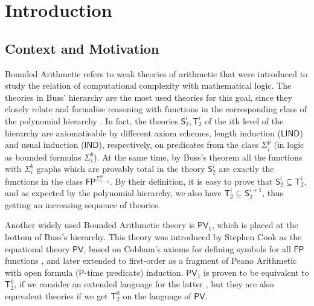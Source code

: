 \documentclass[11pt]{article}
\renewcommand{\P}{\mathsf{P}}
\newcommand{\PV}{\mathsf{PV}}
\newcommand{\FP}{\mathsf{FP}}
\theoremstyle{definition}
\theoremstyle{definition}
\theoremstyle{remark}
\begin{document}
\newpage
\tableofcontents

\newpage

\section{Introduction}

\subsection{Context and Motivation}

Bounded Arithmetic refers to weak theories of arithmetic that were introduced to study the relation of computational complexity with mathematical logic. The theories in Buss' hierarchy are the most used theories for this goal, since they closely relate and formalise reasoning with functions in the corresponding class of the polynomial hierarchy \cite{buss1985bounded}. In fact, the theories $\mathsf{S}^i_2,\mathsf{T}^i_2$ of the $i$th level of the hierarchy are axiomatisable by different axiom schemes, length induction ($\mathsf{LIND}$) and usual induction ($\mathsf{IND}$), respectively, on predicates from the class $\Sigma^p_i$ (in logic as bounded formulas $\Sigma^b_i$). At the same time, by Buss's theorem all the functions with $\Sigma^b_i$ graphs which are provably total in the theory $\mathsf{S}^i_2$ are exactly the functions in the class $\mathsf{FP}^{\Sigma^p_{i-1}}$. By their definition, it is easy to prove that $\mathsf{S}^i_2 \subseteq\mathsf{T}^i_2$, and as expected by the polynomial hierarchy, we also have $\mathsf{T}^{i}_2 \subseteq\mathsf{S}^{i+1}_2$, thus getting an increasing sequence of theories.

Another widely used Bounded Arithmetic theory is $\PV_1$, which is placed at the bottom of Buss's hierarchy. This theory was introduced by Stephen Cook \cite{Coo75} as the equational theory $\PV$, based on Cobham's axioms for defining symbols for all $\FP$ functions \cite{Cob64}, and later extended to first-order as a fragment of Peano Arithmetic \cite{KrajicekPT91} with open formula ($\P$-time predicate) induction. $\PV_1$ is proven to be equivalent to $\mathsf{T}^0_2$, if we consider an extended language for the latter \cite{jerabek:sharply-bounded}, but they are also equivalent theories if we get $\mathsf{T}^0_2$ on the language of $\PV$.
\end{document}

